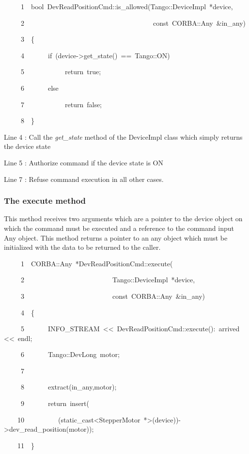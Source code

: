 
\begin{lyxcode}
~~~~~1~~bool~DevReadPositionCmd::is\_allowed(Tango::DeviceImpl~{*}device,

~~~~~2~~~~~~~~~~~~~~~~~~~~~~~~~~~~~~~~~~~~~~const~CORBA::Any~\&in\_any)

~~~~~3~~\{

~~~~~4~~~~~~~if~(device->get\_state()~==~Tango::ON)

~~~~~5~~~~~~~~~~~~return~true;

~~~~~6~~~~~~~else

~~~~~7~~~~~~~~~~~~return~false;

~~~~~8~~\}
\end{lyxcode}


Line 4 : Call the \emph{get\_state} method of the DeviceImpl class
which simply returns the device state

Line 5 : Authorize command if the device state is ON

Line 7 : Refuse command execution in all other cases. 

\subsubsection{The execute method}

This method receives two arguments which are a pointer to the device
object on which the command must be executed and a reference to the
command input Any object. This method returns a pointer to an any
object which must be initialized with the data to be returned to the
caller.


\begin{lyxcode}
~~~~~1~~CORBA::Any~{*}DevReadPositionCmd::execute(

~~~~~2~~~~~~~~~~~~~~~~~~~~~~~~~~Tango::DeviceImpl~{*}device,

~~~~~3~~~~~~~~~~~~~~~~~~~~~~~~~~const~CORBA::Any~\&in\_any)

~~~~~4~~\{~~~~~~~

~~~~~5~~~~~~~INFO\_STREAM~<\textcompwordmark{}<~\textquotedbl{}DevReadPositionCmd::execute():~arrived\textquotedbl{}~<\textcompwordmark{}<~endl;

~~~~~6~~~~~~~Tango::DevLong~motor;

~~~~~7~~

~~~~~8~~~~~~~extract(in\_any,motor);

~~~~~9~~~~~~~return~insert(

~~~~10~~~~~~~~~~(static\_cast<StepperMotor~{*}>(device))->dev\_read\_position(motor));

~~~~11~~\}
\end{lyxcode}


